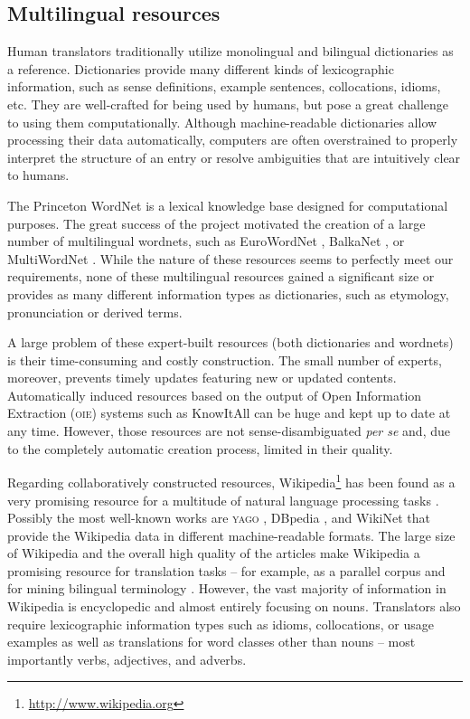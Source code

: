 \documentclass[output=paper]{LSP/langsci}
\begin{document}
\subsection{Multilingual resources}

Human translators traditionally utilize monolingual and bilingual dictionaries as a reference. Dictionaries provide many different kinds of lexicographic information, such as sense definitions, example sentences, collocations, idioms, etc. They are well-crafted for being used by humans, but pose a great challenge to using them computationally. Although machine-readable dictionaries allow processing their data automatically, computers are often overstrained to properly interpret the structure of an entry or resolve ambiguities that are intuitively clear to humans.

The Princeton WordNet \citep{Fellbaum98} is a lexical knowledge base designed for computational purposes. The great success of the project motivated the creation of a large number of multilingual wordnets, such as EuroWordNet \citep{Vossen1998}, BalkaNet \citep{Stamou02}, or MultiWordNet \citep{Pianta02}. While the nature of these resources seems to perfectly meet our requirements, none of these multilingual resources gained a significant size or provides as many different information types as dictionaries, such as etymology, pronunciation or derived terms.

A large problem of these expert-built resources (both dictionaries and wordnets) is their time-consuming and costly construction. The small number of experts, moreover, prevents timely updates featuring new or updated contents. Automatically induced resources based on the output of Open Information Extraction (\textsc{oie}) systems such as KnowItAll \citep{Banko07} can be huge and kept up to date at any time. However, those resources are not sense-disambiguated \textit{per se} and, due to the completely automatic creation process, limited in their quality.

Regarding collaboratively constructed resources, Wikipedia\footnote{\url{http://www.wikipedia.org}} has been found as a very promising resource for a multitude of natural language processing tasks \citep{Zesch2007,Medelyan09}. Possibly the most well-known works are \textsc{yago} \citep{Suchanek08}, DBpedia \citep{Bizer09}, and WikiNet \citep{Nastase10} that provide the Wikipedia data in different machine-readable formats. The large size of Wikipedia and the overall high quality of the articles make Wikipedia a promising resource for translation tasks -- for example, as a parallel corpus \citep{Adafre06} and for mining bilingual terminology \citep{Erdmann09}. However, the vast majority of information in Wikipedia is encyclopedic and almost entirely focusing on nouns. Translators also require lexicographic information types such as idioms, collocations, or usage examples as well as translations for word classes other than nouns -- most importantly verbs, adjectives, and adverbs. 
\end{document}
